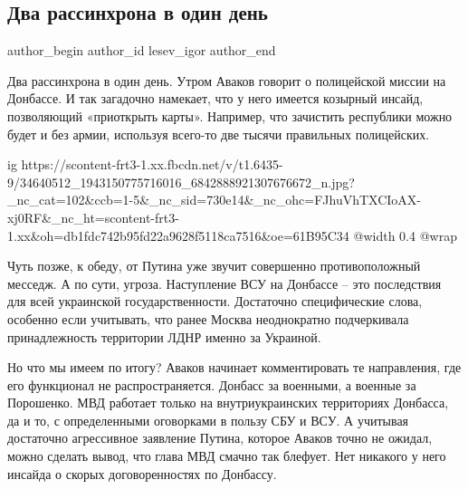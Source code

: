  
 
 
 
 
 
\subsection{Два рассинхрона в один день}
\label{sec:07_06_2018.fb.lesev_igor.1.donbass}
 
\ifcmt
 author_begin
   author_id lesev_igor
 author_end
\fi

Два рассинхрона в один день. Утром Аваков говорит о полицейской миссии на
Донбассе. И так загадочно намекает, что у него имеется козырный инсайд,
позволяющий «приоткрыть карты». Например, что зачистить республики можно будет
и без армии, используя всего-то две тысячи правильных полицейских.

\ifcmt
  ig https://scontent-frt3-1.xx.fbcdn.net/v/t1.6435-9/34640512_1943150775716016_6842888921307676672_n.jpg?_nc_cat=102&ccb=1-5&_nc_sid=730e14&_nc_ohc=FJhuVhTXCIoAX-xj0RF&_nc_ht=scontent-frt3-1.xx&oh=db1fdc742b95fd22a9628f5118ca7516&oe=61B95C34
  @width 0.4
  @wrap 
\fi

Чуть позже, к обеду, от Путина уже звучит совершенно противоположный месседж. А
по сути, угроза. Наступление ВСУ на Донбассе – это последствия для всей
украинской государственности. Достаточно специфические слова, особенно если
учитывать, что ранее Москва неоднократно подчеркивала принадлежность территории
ЛДНР именно за Украиной.

Но что мы имеем по итогу? Аваков начинает комментировать те направления, где
его функционал не распространяется. Донбасс за военными, а военные за
Порошенко. МВД работает только на внутриукраинских территориях Донбасса, да и
то, с определенными оговорками в пользу СБУ и ВСУ. А учитывая достаточно
агрессивное заявление Путина, которое Аваков точно не ожидал, можно сделать
вывод, что глава МВД смачно так блефует. Нет никакого у него инсайда о скорых
договоренностях по Донбассу.

